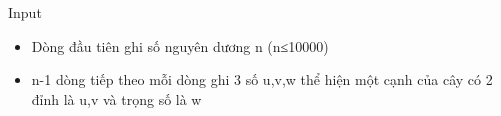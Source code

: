 Input
\begin{itemize}
	\item     Dòng đầu tiên ghi số nguyên dương n (n≤10000)   
	\item     n-1 dòng tiếp theo mỗi dòng ghi 3 số u,v,w thể hiện một cạnh của cây có 2 đỉnh là u,v và trọng số là w   
\end{itemize}